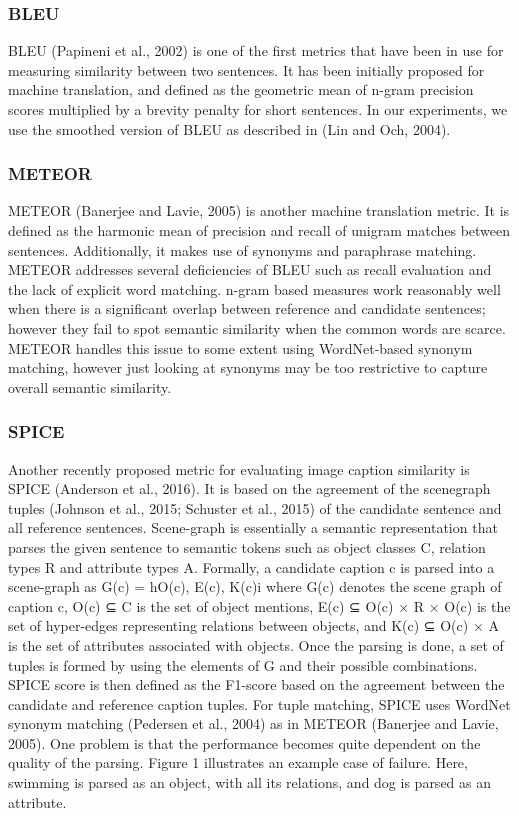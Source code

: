 \documentclass[a4paper]{article}
\begin{document}
\subsubsection{BLEU}
BLEU (Papineni et al., 2002) is one of the first metrics
that have been in use for measuring similarity
between two sentences. It has been initially proposed
for machine translation, and defined as the
geometric mean of n-gram precision scores multiplied
by a brevity penalty for short sentences. In
our experiments, we use the smoothed version of
BLEU as described in (Lin and Och, 2004).
\subsubsection{METEOR}
METEOR (Banerjee and Lavie, 2005) is another
machine translation metric. It is defined as the
harmonic mean of precision and recall of unigram
matches between sentences. Additionally, it
makes use of synonyms and paraphrase matching.
METEOR addresses several deficiencies of BLEU
such as recall evaluation and the lack of explicit
word matching. n-gram based measures work reasonably
well when there is a significant overlap between reference and candidate sentences; however
they fail to spot semantic similarity when
the common words are scarce. METEOR handles
this issue to some extent using WordNet-based
synonym matching, however just looking at synonyms
may be too restrictive to capture overall semantic
similarity.
\subsubsection{SPICE}
Another recently proposed metric for evaluating
image caption similarity is SPICE (Anderson et al.,
2016). It is based on the agreement of the scenegraph
tuples (Johnson et al., 2015; Schuster et al.,
2015) of the candidate sentence and all reference
sentences. Scene-graph is essentially a semantic
representation that parses the given sentence to semantic
tokens such as object classes C, relation
types R and attribute types A. Formally, a candidate
caption c is parsed into a scene-graph as
G(c) = hO(c), E(c), K(c)i
where G(c) denotes the scene graph of caption c,
O(c) ⊆ C is the set of object mentions, E(c) ⊆
O(c) × R × O(c) is the set of hyper-edges representing
relations between objects, and K(c) ⊆
O(c) × A is the set of attributes associated with
objects. Once the parsing is done, a set of tuples is formed by using the elements of G and their possible
combinations. SPICE score is then defined as
the F1-score based on the agreement between the
candidate and reference caption tuples. For tuple
matching, SPICE uses WordNet synonym matching
(Pedersen et al., 2004) as in METEOR (Banerjee
and Lavie, 2005). One problem is that the performance
becomes quite dependent on the quality
of the parsing. Figure 1 illustrates an example case
of failure. Here, swimming is parsed as an object,
with all its relations, and dog is parsed as an attribute.
\end{document}
